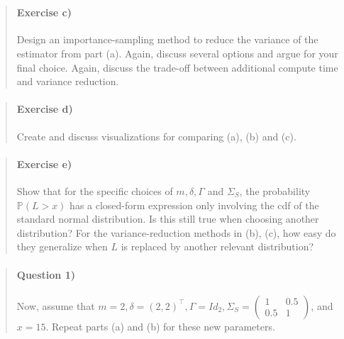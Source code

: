 \documentclass[11pt]{article}
\begin{document}
    \begin{center}
    \end{center}
    { \hspace*{\fill} \\}
    
    \begin{quote}
\mbox{}%
\paragraph{Exercise c)}\label{exercise-c}

Design an importance-sampling method to reduce the variance of the
estimator from part (a). Again, discuss several options and argue for
your final choice. Again, discuss the trade-off between additional
compute time and variance reduction.
\end{quote}

    \begin{quote}
\mbox{}%
\paragraph{Exercise d)}\label{exercise-d}

Create and discuss visualizations for comparing (a), (b) and (c).
\end{quote}

    \begin{quote}
\mbox{}%
\paragraph{Exercise e)}\label{exercise-e}

Show that for the specific choices of \(m, \delta, \Gamma\) and
\(\Sigma_S\), the probability \(\mathbb{P}(L>x)\) has a closed-form
expression only involving the cdf of the standard normal distribution.
Is this still true when choosing another distribution? For the
variance-reduction methods in (b), (c), how easy do they generalize when
\(L\) is replaced by another relevant distribution?
\end{quote}

    \begin{quote}
\mbox{}%
\paragraph{Question 1)}\label{question-1}

Now, assume that
\(m=2, \delta=(2,2)^{\top}, \Gamma=I d_2, \Sigma_S=\left(\begin{array}{cc}1 & 0.5 \\ 0.5 & 1\end{array}\right)\),
and \(x=15\). Repeat parts (a) and (b) for these new parameters.
\end{quote}
\end{document}
